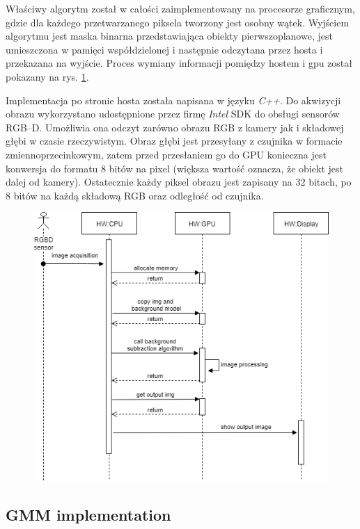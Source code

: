 \documentclass[b5paper,10pt,twoside]{article}
\begin{document}
{Właściwy algorytm został w całości zaimplementowany na procesorze graficznym, gdzie dla każdego przetwarzanego piksela tworzony jest osobny wątek. Wyjściem algorytmu jest maska binarna przedstawiająca obiekty pierwszoplanowe, jest umieszczona w pamięci współdzielonej i następnie odczytana przez hosta i przekazana na wyjście. Proces wymiany informacji pomiędzy hostem i gpu został pokazany na rys. \ref{fig:gpu_alg}.

Implementacja po stronie hosta została napisana w języku \textit{C++}. Do akwizycji obrazu wykorzystano udostępnione przez firmę \textit{Intel} SDK do obsługi sensorów RGB--D. Umożliwia ona odczyt zarówno obrazu RGB z kamery  jak i składowej głębi w czasie rzeczywistym. Obraz głębi jest przesyłany z czujnika w formacie zmiennoprzecinkowym, zatem przed przesłaniem go do GPU konieczna jest konwersja do formatu 8 bitów na pixel (większa wartość oznacza, że obiekt jest dalej od kamery). Ostatecznie każdy piksel obrazu jest zapisany na 32 bitach, po 8 bitów na każdą składową RGB oraz odległość od czujnika. 

\begin{figure}[!t]
	\begin{center}
		\includegraphics[scale=0.50]{img/gpu_bs_alg.png}
		\caption{}
		\label{fig:gpu_alg}
	\end{center}
\end{figure}

\subsection{GMM implementation}
\label{subsec:gmm_implementation}


}
\end{document}
